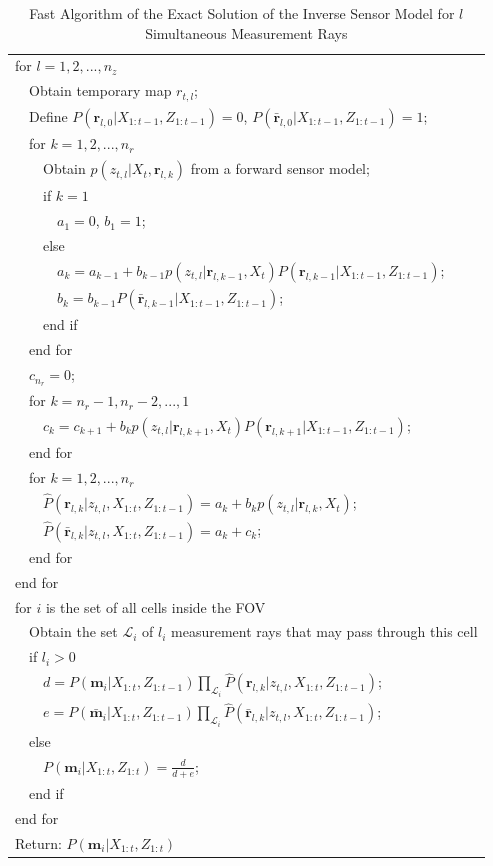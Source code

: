 \documentclass[letterpaper, 10pt, conference]{ieeeconf}
\begin{document}
\begin{table}
\begin{tabular}{ l }
  for $l = 1,2,...,n_z$\\
   \ \ Obtain temporary map $r_{t,l}$;\\
   \ \ Define $P(\mathbf{r}_{l,0}|X_{1:t-1},Z_{1:t-1})=0$, $P(\bar{\mathbf{r}}_{l,0}|X_{1:t-1},Z_{1:t-1})=1$;\\
   \ \ for $k = 1,2,...,n_r$\\
   \ \ \ \ Obtain $p(z_{t,l}|X_t,\mathbf{r}_{l,k})$ from a forward sensor model;\\
   \ \ \ \ if $k=1$\\
   \ \ \ \ \ \ $a_1=0$, $b_1=1$;\\
   \ \ \ \ else\\
   \ \ \ \ \ \ $a_k=a_{k-1}+b_{k-1}p(z_{t,l}|\mathbf{r}_{l,k-1},X_t)P(\mathbf{r}_{l,k-1}|X_{1:t-1},Z_{1:t-1})$;\\
   \ \ \ \ \ \ $b_k=b_{k-1}P(\bar{\mathbf{r}}_{l,k-1}|X_{1:t-1},Z_{1:t-1})$;\\
   \ \ \ \ end if\\
   \ \ end for\\
   \ \ $c_{n_r}=0$;\\
   \ \ for $k = n_r-1,n_r-2,...,1$\\
   \ \ \ \ $c_k=c_{k+1}+b_{k}p(z_{t,l}|\mathbf{r}_{l,k+1},X_t)P(\mathbf{r}_{l,k+1}|X_{1:t-1},Z_{1:t-1})$;\\
   \ \ end for\\
   \ \ for $k = 1,2,...,n_r$\\
   \ \ \ \ $\hat P(\mathbf{r}_{l,k}|z_{t,l},X_{1:t},Z_{1:t-1})=a_k+b_kp(z_{t,l}|\mathbf{r}_{l,k},X_t)$;\\
   \ \ \ \ $\hat P(\bar{\mathbf{r}}_{l,k}|z_{t,l},X_{1:t},Z_{1:t-1})=a_k+c_k$;\\
   \ \ end for\\
   end for\\
   for $i$ is the set of all cells inside the FOV\\
   \ \ Obtain the set $\mathcal L_i$ of $l_i$ measurement rays that may pass through this cell\\
   \ \ if $l_i>0$\\
   \ \ \ \ $d=P(\mathbf{m}_i|X_{1:t},Z_{1:t-1})\prod_{\mathcal L_i}\hat P(\mathbf{r}_{l,k}|z_{t,l},X_{1:t},Z_{1:t-1})$;\\
   \ \ \ \ $e=P(\bar{\mathbf{m}}_i|X_{1:t},Z_{1:t-1})\prod_{\mathcal L_i}\hat P(\bar{\mathbf{r}}_{l,k}|z_{t,l},X_{1:t},Z_{1:t-1})$;\\
   \ \ else\\
   \ \ \ \ $P(\mathbf{m}_i|X_{1:t},Z_{1:t})=\frac{d}{d+e}$;\\
   \ \ end if\\
   end for\\
Return: $P(\mathbf{m}_i|X_{1:t},Z_{1:t})$\\
\end{tabular}
\caption{Fast Algorithm of the Exact Solution of the Inverse Sensor Model for $l$ Simultaneous Measurement Rays}
\label{tab:Alg_ISM_2D}
\end{table}
\end{document}
